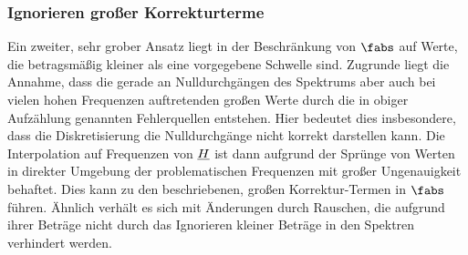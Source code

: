 \documentclass[../Report.tex]{subfiles}
\begin{document}
\subsubsection*{Ignorieren großer Korrekturterme}
\label{subsubsec:opt.H.RMS}

Ein zweiter, sehr grober Ansatz liegt in der Beschränkung von $\fabs$ auf Werte, die betragsmäßig kleiner als eine vorgegebene Schwelle sind. Zugrunde liegt die Annahme, dass die gerade an Nulldurchgängen des Spektrums aber auch bei vielen hohen Frequenzen auftretenden großen Werte durch die in obiger Aufzählung genannten Fehlerquellen entstehen.
Hier bedeutet dies insbesondere, dass die Diskretisierung die Nulldurchgänge nicht korrekt darstellen kann. Die Interpolation auf Frequenzen von $\underline{H}$ ist dann aufgrund der Sprünge von Werten in direkter Umgebung der problematischen Frequenzen mit großer Ungenauigkeit behaftet. Dies kann zu den beschriebenen, großen Korrektur-Termen in $\fabs$ führen. Ähnlich verhält es sich mit Änderungen durch Rauschen, die aufgrund ihrer Beträge nicht durch das Ignorieren kleiner Beträge in den Spektren verhindert werden.
\end{document}
